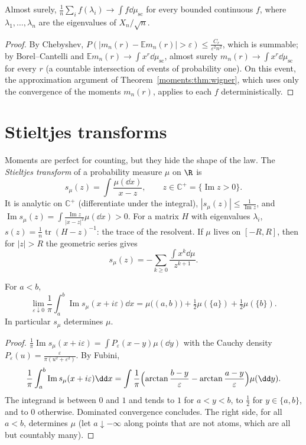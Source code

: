 \begin{theorem}\label{thm:wigneras}
Almost surely, $\frac1n\sum_if(\lambda_i)\to\int f\dd\mu_{\mathrm{sc}}$ for every bounded continuous $f$, where $\lambda_1,\dots,\lambda_n$ are the eigenvalues of $X_n/\sqrt n$.
\end{theorem}

\begin{proof}
By Chebyshev, $P(|m_n(r)-\mathbb Em_n(r)|>\varepsilon)\le\frac{C_r}{\varepsilon^2n^2}$, which is summable; by Borel--Cantelli and $\mathbb Em_n(r)\to\int x^r\dd\mu_{\mathrm{sc}}$, almost surely $m_n(r)\to\int x^r\dd\mu_{\mathrm{sc}}$ for every $r$ (a
countable intersection of events of probability one). On this event, the approximation argument of Theorem~\ref{moments:thm:wigner}, which uses only the convergence of the moments $m_n(r)$, applies to each $f$ deterministically.
\end{proof}

\section{Stieltjes transforms}

Moments are perfect for counting, but they hide the shape of the law. The \emph{Stieltjes transform} of a probability measure $\mu$ on $\R$ is
\[
s_\mu(z)=\int\frac{\mu(\dd x)}{x-z},\qquad z\in\mathbb C^+=\{\operatorname{Im}z>0\}.
\]
It is analytic on $\mathbb C^+$ (differentiate under the integral), $|s_\mu(z)|\le\frac1{\operatorname{Im}z}$, and $\operatorname{Im}s_\mu(z)=\int\frac{\operatorname{Im}z}{|x-z|^2}\mu(\dd x)>0$. For a matrix $H$ with eigenvalues $\lambda_i$,
$s(z)=\frac1n\operatorname{tr}(H-z)^{-1}$: the trace of the resolvent. If $\mu$ lives on $[-R,R]$, then for $|z|>R$ the geometric series gives
\begin{equation}\label{eq:stieltjesmoments}
s_\mu(z)=-\sum_{k\ge0}\frac{\int x^k\dd\mu}{z^{k+1}}.
\end{equation}

\begin{proposition}\label{prop:inversion}
For $a<b$,
\[
\lim_{\varepsilon\downarrow0}\frac1\pi\int_a^b\operatorname{Im}s_\mu(x+i\varepsilon)\dd x=\mu\bigl((a,b)\bigr)+\tfrac12\mu(\{a\})+\tfrac12\mu(\{b\}).
\]
In particular $s_\mu$ determines $\mu$.
\end{proposition}

\begin{proof}
$\frac1\pi\operatorname{Im}s_\mu(x+i\varepsilon)=\int P_\varepsilon(x-y)\mu(\dd y)$ with the Cauchy density $P_\varepsilon(u)=\frac{\varepsilon}{\pi(u^2+\varepsilon^2)}$. By Fubini,
\[
\frac1\pi\int_a^b\operatorname{Im}s_\mu(x+i\varepsilon)\dd x=\int\frac1\pi\Bigl(\arctan\frac{b-y}\varepsilon-\arctan\frac{a-y}\varepsilon\Bigr)\mu(\dd y).
\]
The integrand is between $0$ and $1$ and tends to $1$ for $a<y<b$, to $\frac12$ for $y\in\{a,b\}$, and to $0$ otherwise. Dominated convergence concludes. The right side, for all $a<b$, determines $\mu$ (let $a\downarrow-\infty$
along points that are not atoms, which are all but countably many).
\end{proof}

